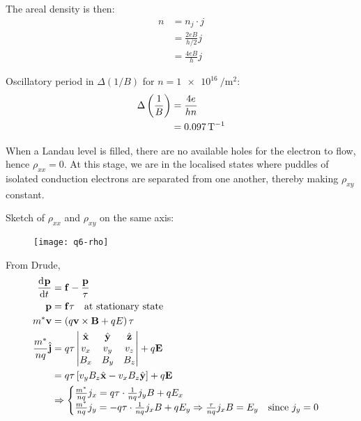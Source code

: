 \begin{parts}
	The areal density is then:
	\begin{align*}
		n &= n_j \cdot j \\
		&= \frac{2eB}{h/2} j \\
		&= \frac{4eB}{h} j
	\end{align*}
	
	Oscillatory period in $\Delta(1/B)$ for $n = \SI{1e16}{\per\metre\squared}$:
	\begin{align*}
		\Delta\left(\frac{1}{B}\right) &= \frac{4e}{hn} \\
		&= \SI{0.097}{\per\tesla}
	\end{align*}
	
	When a Landau level is filled, there are no available holes for the electron to flow, hence $\rho_{xx} = 0$.
	At this stage, we are in the localised states where puddles of isolated conduction electrons are separated from one another, thereby making $\rho_{xy}$ constant.
	
	Sketch of $\rho_{xx}$ and $\rho_{xy}$ on the same axis:
	\begin{figure}[H]
		\centering
		\texttt{[image: q6-rho]}
	\end{figure}
	
	From Drude,
	\begin{align*}
		\frac{\mathrm{d}^{}{\mathbf{p}}}{\mathrm{d}{t}^{}} &= \mathbf{f} - \frac{\mathbf{p}}{\tau} \\
		\mathbf{p} &= \mathbf{f}\tau \textnormal{\hspace{1em}at stationary state} \\
		m^* \mathbf{v} &= \left(q \mathbf{v}\times\mathbf{B} + qE\right) \tau \\
		\frac{m^*}{nq} \hat{\mathbf{j}} &= q\tau \begin{vmatrix}
			\hat{\mathbf{x}} & \hat{\mathbf{y}} & \hat{\mathbf{z}} \\
			v_x & v_y & v_z \\
			B_x & B_y & B_z
		\end{vmatrix} + q\mathbf{E} \\
		&= q\tau \left[v_y B_z \hat{\mathbf{x}} - v_x B_z \hat{\mathbf{y}}\right] + q\mathbf{E} \\
		&\Rightarrow \begin{cases}
			\frac{m^*}{nq} j_x = q\tau \cdot \frac{1}{nq} j_y B + qE_x \\
			\frac{m^*}{nq} j_y = -q\tau \cdot \frac{1}{nq} j_x B + qE_y \Rightarrow \frac{\tau}{nq} j_x B = E_y \textnormal{\hspace{1em}since $j_y = 0$}
		\end{cases}
	\end{align*}
	

\end{parts}
